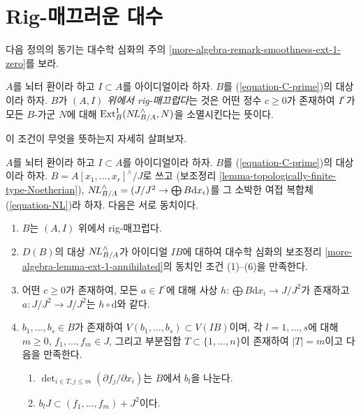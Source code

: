 \section{Rig-매끄러운 대수}
\label{section-rig-smooth}

\noindent
다음 정의의 동기는 대수학 심화의 주의
\ref{more-algebra-remark-smoothness-ext-1-zero}를 보라.

\begin{definition}
\label{definition-rig-smooth-homomorphism}
$A$를 뇌터 환이라 하고 $I \subset A$를 아이디얼이라 하자.
$B$를 (\ref{equation-C-prime})의 대상이라 하자.
$B$가 {\it $(A, I)$ 위에서 rig-매끄럽다}는 것은 어떤 정수 $c \geq 0$가 존재하여
$I^c$가 모든 $B$-가군 $N$에 대해 $\mathop{\mathrm{Ext}}\nolimits^1_B(\mathop{N\!L}\nolimits_{B/A}^\wedge, N)$을 소멸시킨다는 뜻이다.
\end{definition}

\noindent
이 조건이 무엇을 뜻하는지 자세히 살펴보자.

\begin{lemma}
\label{lemma-equivalent-with-artin-smooth}
$A$를 뇌터 환이라 하고 $I \subset A$를 아이디얼이라 하자.
$B$를 (\ref{equation-C-prime})의 대상이라 하자.
$B = A[x_1, \ldots, x_r]^\wedge/J$로 쓰고
(보조정리 \ref{lemma-topologically-finite-type-Noetherian}),
$\mathop{N\!L}\nolimits_{B/A}^\wedge = (J/J^2 \to \bigoplus B\text{d}x_i)$를
그 소박한 여접 복합체 (\ref{equation-NL})라 하자. 다음은 서로 동치이다.
\begin{enumerate}
\item $B$는 $(A, I)$ 위에서 rig-매끄럽다.
\item $D(B)$의 대상 $\mathop{N\!L}\nolimits_{B/A}^\wedge$가 아이디얼 $IB$에 대하여
대수학 심화의 보조정리 \ref{more-algebra-lemma-ext-1-annihilated}의
동치인 조건 (1)--(6)을 만족한다.
\item 어떤 $c \geq 0$가 존재하여, 모든 $a \in I^c$에 대해 사상
$h : \bigoplus B\text{d}x_i \to J/J^2$가 존재하고
$a : J/J^2 \to J/J^2$는 $h \circ \text{d}$와 같다.
\item $b_1, \ldots, b_s \in B$가 존재하여
$V(b_1, \ldots, b_s) \subset V(IB)$이며, 각 $l = 1, \ldots, s$에 대해
$m \geq 0$, $f_1, \ldots, f_m \in J$, 그리고 부분집합
$T \subset \{1, \ldots, n\}$이 존재하여 $|T| = m$이고 다음을 만족한다.
\begin{enumerate}
\item $\det_{i \in T, j \leq m}(\partial f_j/ \partial x_i)$는
$B$에서 $b_l$을 나눈다.
\item $b_l J \subset (f_1, \ldots, f_m) + J^2$이다.
\end{enumerate}
\end{enumerate}
\end{lemma}

